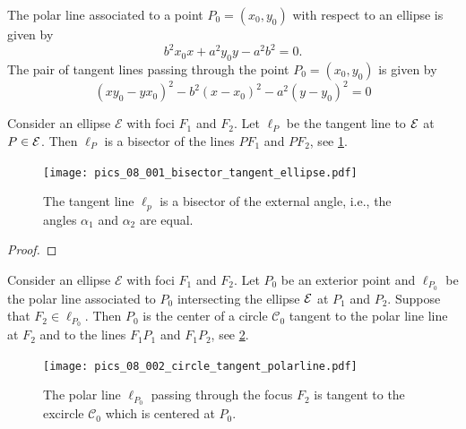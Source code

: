  The polar line associated to a point $P_0=(x_0,y_0)$ with respect to an ellipse is given by
 \[ b^2x_0 x+a^2 y_0y-a^2b^2=0.\]
The pair of tangent lines passing through the point $P_0=(x_0,y_0)$ is given by
 \[ \left( x{ y_0}-y{x_0} \right) ^{2}-{b}^{2} \left( x-{  x_0}
 \right) ^{2}-{a}^{2} \left( y-{ y_0} \right) ^{2}=0 \]

\begin{proposition}\label{prop:bisectorline}
    Consider an ellipse $\mathcal{E}$ with foci $F_1$ and $F_2$. Let $\ell_P$ be the tangent line to $\mathcal{E}$ at $P\in \mathcal{E}$. Then $\ell_P$ is a bisector of the   lines $PF_1$ and $PF_2$, see \cref{fig:bisectorline}.  
\end{proposition}
\begin{figure} 
	\begin{center}
		 \texttt{[image: pics\_08\_001\_bisector\_tangent\_ellipse.pdf]}
		\caption {The tangent line $\ell_p$ is a bisector of the external angle, i.e., the angles $\alpha_1$ and $\alpha_2$ are equal. 	\label{fig:bisectorline} }
	\end{center}

\end{figure}

\begin{proof}

\end{proof}


\begin{proposition}\label{prop:circle_polarline}
    Consider an ellipse $\mathcal{E}$ with foci $F_1$ and $F_2$. Let $ P_0 $ be an exterior point and $\ell_{P_0}$ be the polar line associated to $P_0$ intersecting the ellipse $\mathcal{E}$ at $P_1$ and $P_2$. Suppose that $F_2\in \ell_{P_0}$. Then $P_0$ is  the center of a circle $\mathcal{C}_0$  tangent to the polar line line at $F_2$ and to the lines $F_1P_1$ and $F_1P_2$,   see \cref{fig:circle_polarline}.  
\end{proposition}
\begin{figure} 
	\begin{center}
		 \texttt{[image: pics\_08\_002\_circle\_tangent\_polarline.pdf]}
		\caption {The polar line $\ell_{P_0}$ passing through the focus $F_2$ is tangent to the excircle $\mathcal{C}_0$ which is centered at $P_0$.	\label{fig:circle_polarline} }
	\end{center}

\end{figure}

